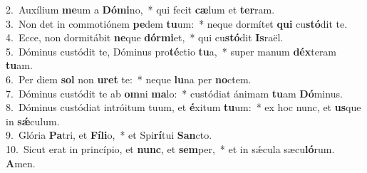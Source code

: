 {2.~}Auxílium \textbf{me}um a \textbf{Dó}\textbf{mi}no,~* qui fecit \textbf{cæ}lum et \textbf{ter}ram.\\
{3.~}Non det in commotiónem \textbf{pe}dem \textbf{tu}um:~* neque dormítet \textbf{qui} cu\textbf{stó}dit te.\\
{4.~}Ecce, non dormitábit \textbf{ne}que \textbf{dór}\textbf{mi}et,~* qui cu\textbf{stó}dit \textbf{Is}raël.\\
{5.~}Dóminus custódit te, Dóminus pro\textbf{té}ctio \textbf{tu}a,~* super manum \textbf{déx}teram \textbf{tu}am.\\
{6.~}Per diem \textbf{sol} non \textbf{u}\textbf{ret} te:~* neque \textbf{lu}na per \textbf{no}ctem.\\
{7.~}Dóminus custódit te ab \textbf{om}ni \textbf{ma}lo:~* custódiat ánimam \textbf{tu}am \textbf{Dó}minus.\\
{8.~}Dóminus custódiat intróitum tuum, et \textbf{é}xitum \textbf{tu}um:~* ex hoc nunc, et \textbf{us}que in \textbf{sǽ}culum.\\
{9.~}Glória \textbf{Pa}tri, et \textbf{Fí}\textbf{li}o,~* et Spi\textbf{rí}tui \textbf{San}cto.\\
{10.~}Sicut erat in princípio, et \textbf{nunc}, et \textbf{sem}per,~* et in sǽcula sæcu\textbf{ló}rum. \textbf{A}men.\\

